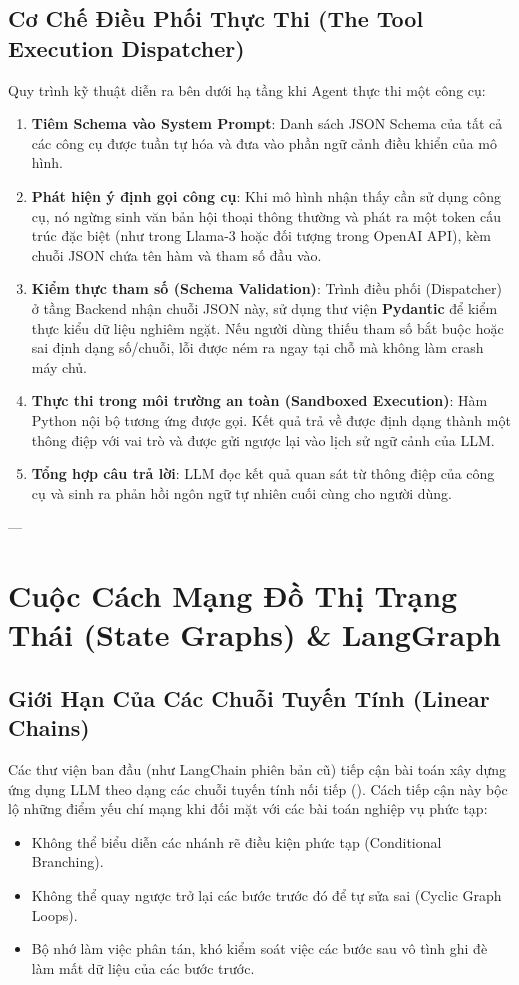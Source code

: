 \subsection{Cơ Chế Điều Phối Thực Thi (The Tool Execution Dispatcher)}
Quy trình kỹ thuật diễn ra bên dưới hạ tầng khi Agent thực thi một công cụ:
\begin{enumerate}
  \item \textbf{Tiêm Schema vào System Prompt}: Danh sách JSON Schema của tất cả các công cụ được tuần tự hóa và đưa vào phần ngữ cảnh điều khiển của mô hình.
  \item \textbf{Phát hiện ý định gọi công cụ}: Khi mô hình nhận thấy cần sử dụng công cụ, nó ngừng sinh văn bản hội thoại thông thường và phát ra một token cấu trúc đặc biệt (như  trong Llama-3 hoặc đối tượng  trong OpenAI API), kèm chuỗi JSON chứa tên hàm và tham số đầu vào.
  \item \textbf{Kiểm thực tham số (Schema Validation)}: Trình điều phối (Dispatcher) ở tầng Backend nhận chuỗi JSON này, sử dụng thư viện \textbf{Pydantic} để kiểm thực kiểu dữ liệu nghiêm ngặt. Nếu người dùng thiếu tham số bắt buộc hoặc sai định dạng số/chuỗi, lỗi được ném ra ngay tại chỗ mà không làm crash máy chủ.
  \item \textbf{Thực thi trong môi trường an toàn (Sandboxed Execution)}: Hàm Python nội bộ tương ứng được gọi. Kết quả trả về được định dạng thành một thông điệp với vai trò  và được gửi ngược lại vào lịch sử ngữ cảnh của LLM.
  \item \textbf{Tổng hợp câu trả lời}: LLM đọc kết quả quan sát từ thông điệp của công cụ và sinh ra phản hồi ngôn ngữ tự nhiên cuối cùng cho người dùng.
\end{enumerate}

---

\section{Cuộc Cách Mạng Đồ Thị Trạng Thái (State Graphs) \& LangGraph}
\label{sec:langgraph-state-graphs}

\subsection{Giới Hạn Của Các Chuỗi Tuyến Tính (Linear Chains)}
Các thư viện ban đầu (như LangChain phiên bản cũ) tiếp cận bài toán xây dựng ứng dụng LLM theo dạng các chuỗi tuyến tính nối tiếp (). Cách tiếp cận này bộc lộ những điểm yếu chí mạng khi đối mặt với các bài toán nghiệp vụ phức tạp:
\begin{itemize}
  \item Không thể biểu diễn các nhánh rẽ điều kiện phức tạp (Conditional Branching).
  \item Không thể quay ngược trở lại các bước trước đó để tự sửa sai (Cyclic Graph Loops).
  \item Bộ nhớ làm việc phân tán, khó kiểm soát việc các bước sau vô tình ghi đè làm mất dữ liệu của các bước trước.
\end{itemize}


